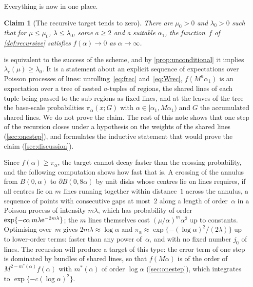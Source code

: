 \documentclass[11pt,letterpaper]{article}
\newtheorem{claim}{Claim}
\newenvironment{boxedclaim}[2]{\renewcommand{\theclaim}{#1}\begin{framed}\begin{claim}[#2]}{\end{claim}\end{framed}}
\begin{document}
Everything is now in one place.

\begin{boxedclaim}{T}{The recursive target tends to zero}
\label{claim:T}
There are $\mu_0>0$ and $\lambda_0>0$ such that for $\mu\le\mu_0$, $\lambda\le\lambda_0$, some $a\ge2$ and a suitable $\alpha_1$, the function~$f$ of \cref{def:recursive} satisfies $f(\alpha)\to0$ as $\alpha\to\infty$.
\end{boxedclaim}

 is equivalent to the success of the scheme, and by \cref{prop:unconditional} it implies $\lambda_c(\mu)\ge\lambda_0$. It is a statement about an explicit sequence of expectations over Poisson processes of lines: unrolling~\eqref{eq:frec} and~\eqref{eq:Wrec}, $f(M^n\alpha_1)$ is an expectation over a tree of nested $a$-tuples of regions, the shared lines of each tuple being passed to the sub-regions as fixed lines, and at the leaves of the tree the base-scale probabilities $\pi_{\alpha}(x;G)$ with $\alpha\in[\alpha_1,M\alpha_1)$ and $G$ the accumulated shared lines. We do not prove the claim. The rest of this note shows that one step of the recursion closes under a hypothesis on the weights of the shared lines (\cref{sec:onestep}), and formulates the inductive statement that would prove the claim (\cref{sec:discussion}).

\begin{remark}
\label{rem:order}
Since $f(\alpha)\ge\pi_\alpha$, the target cannot decay faster than the crossing probability, and the following computation shows how fast that is. A crossing of the annulus from $B(0,\alpha)$ to $\partial B(0,8\alpha)$ by unit disks whose centres lie on lines requires, if all centres lie on $m$ lines running together within distance~$1$ across the annulus, a sequence of points with consecutive gaps at most~$2$ along a length of order~$\alpha$ in a Poisson process of intensity $m\lambda$, which has probability of order $\exp\{-c\alpha\,m\lambda\mathrm{e}^{-2m\lambda}\}$; the $m$ lines themselves cost $(\mu/\alpha)^{m}\alpha^2$ up to constants. Optimising over~$m$ gives $2m\lambda\approx\log\alpha$ and $\pi_\alpha\approx\exp\{-(\log\alpha)^2/(2\lambda)\}$ up to lower-order terms: faster than any power of~$\alpha$, and with no fixed number $j_0$ of lines. The recursion will produce a target of this type: the error term of one step is dominated by bundles of shared lines, so that $f(M\alpha)$ is of the order of $M^{2-m^*(\alpha)}f(\alpha)$ with $m^*(\alpha)$ of order $\log\alpha$ (\cref{sec:onestep}), which integrates to $\exp\{-c(\log\alpha)^2\}$.
\end{remark}
\end{document}
